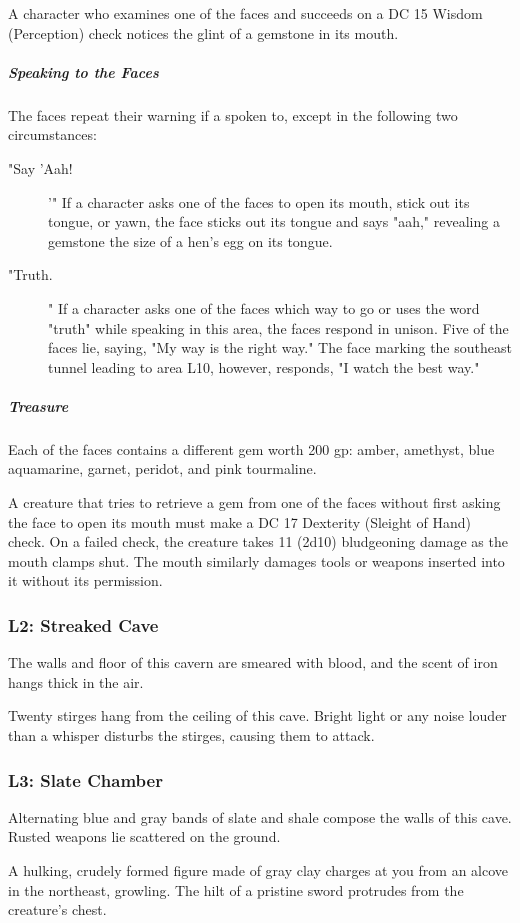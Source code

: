 \documentclass[10pt,a4paper,twoside,bg=print,twocolumn,openany,nodeprecatedcode]{dndbook}
\begin{document}
A character who examines one of the faces and succeeds on a DC 15 Wisdom (Perception) check notices the glint of a gemstone in its mouth.

\subparagraph{Speaking to the Faces}
The faces repeat their warning if a spoken to, except in the following two circumstances:


\begin{description}
\item["Say 'Aah!]
'" If a character asks one of the faces to open its mouth, stick out its tongue, or yawn, the face sticks out its tongue and says "aah," revealing a gemstone the size of a hen's egg on its tongue.
\item["Truth.]
" If a character asks one of the faces which way to go or uses the word "truth" while speaking in this area, the faces respond in unison. Five of the faces lie, saying, "My way is the right way." The face marking the southeast tunnel leading to area L10, however, responds, "I watch the best way."
\end{description}

\subparagraph{Treasure}
Each of the faces contains a different gem worth 200 gp: amber, amethyst, blue aquamarine, garnet, peridot, and pink tourmaline.

A creature that tries to retrieve a gem from one of the faces without first asking the face to open its mouth must make a DC 17 Dexterity (Sleight of Hand) check. On a failed check, the creature takes 11 (2d10) bludgeoning damage as the mouth clamps shut. The mouth similarly damages tools or weapons inserted into it without its permission.

\subsubsection{L2: Streaked Cave}
\begin{DndReadAloud}{}
The walls and floor of this cavern are smeared with blood, and the scent of iron hangs thick in the air.

\end{DndReadAloud}

Twenty stirges hang from the ceiling of this cave. Bright light or any noise louder than a whisper disturbs the stirges, causing them to attack.

\subsubsection{L3: Slate Chamber}
\begin{DndReadAloud}{}
Alternating blue and gray bands of slate and shale compose the walls of this cave. Rusted weapons lie scattered on the ground.

A hulking, crudely formed figure made of gray clay charges at you from an alcove in the northeast, growling. The hilt of a pristine sword protrudes from the creature's chest.

\end{DndReadAloud}
\end{document}
